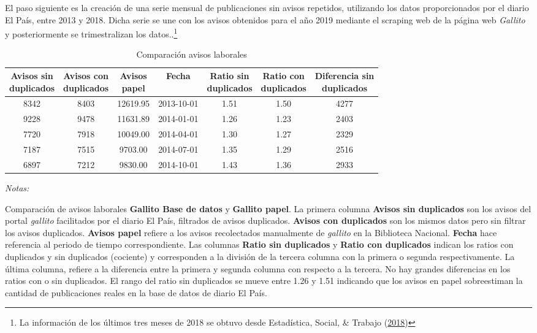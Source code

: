 \documentclass[12pt,oneside]{reedthesis}
\begin{document}
El paso siguiente es la creación de una serie mensual de publicaciones sin avisos repetidos, utilizando los datos proporcionados por el diario El País, entre 2013 y 2018. Dicha serie se une con los avisos obtenidos para el año 2019 mediante el scraping web de la página web \emph{Gallito} y posteriormente se trimestralizan los datos..\footnote{La información de los últimos tres meses de 2018 se obtuvo desde Estadística, Social, \& Trabajo (\protect\hyperlink{ref-MTSS2018}{2018})}
\begin{table}[!h]

\caption{\label{tab:comparacion-gallito}Comparación avisos laborales}
\centering
\fontsize{10}{12}\selectfont
\begin{threeparttable}
\begin{tabular}[t]{ccccccc}
\toprule
\makecell[l]{Avisos sin\\ duplicados} & \makecell[l]{Avisos con\\ duplicados} & \makecell[l]{Avisos\\ papel} & Fecha & \makecell[l]{Ratio sin\\ duplicados} & \makecell[l]{Ratio con\\ duplicados} & \makecell[l]{Diferencia sin\\ duplicados}\\
\midrule
8342 & 8403 & 12619.95 & 2013-10-01 & 1.51 & 1.50 & 4277\\
9228 & 9478 & 11631.89 & 2014-01-01 & 1.26 & 1.23 & 2403\\
7720 & 7918 & 10049.00 & 2014-04-01 & 1.30 & 1.27 & 2329\\
7187 & 7515 & 9703.00 & 2014-07-01 & 1.35 & 1.29 & 2516\\
6897 & 7212 & 9830.00 & 2014-10-01 & 1.43 & 1.36 & 2933\\
\bottomrule
\end{tabular}
\begin{tablenotes}
\item \textit{Notas:} 
\item \footnotesize Comparación de avisos laborales \textbf{Gallito Base de datos} y \textbf{Gallito papel}. La primera columna \textbf{Avisos sin duplicados} son los avisos del portal \textit{gallito} facilitados por el diario El País, filtrados de avisos duplicados. \textbf{Avisos con duplicados} son los mismos datos pero sin filtrar los avisos duplicados. \textbf{Avisos papel} refiere a los avisos recolectados manualmente de \textit{gallito} en la Biblioteca Nacional. \textbf{Fecha} hace referencia al periodo de tiempo correspondiente. Las columnas \textbf{Ratio sin duplicados} y \textbf{Ratio con duplicados} indican los ratios con duplicados y sin duplicados (cociente) y corresponden a la división de la tercera columna con la primera o segunda respectivamente. La última columna, refiere a la diferencia entre la primera y segunda columna con respecto a la tercera. No hay grandes diferencias en los ratios con o sin duplicados. El rango del ratio sin duplicados se mueve entre 1.26 y 1.51 indicando que los avisos en papel sobreestiman la cantidad de publicaciones reales en la base de datos de diario El País.


\end{tablenotes}
\end{threeparttable}
\end{table}
\end{document}
